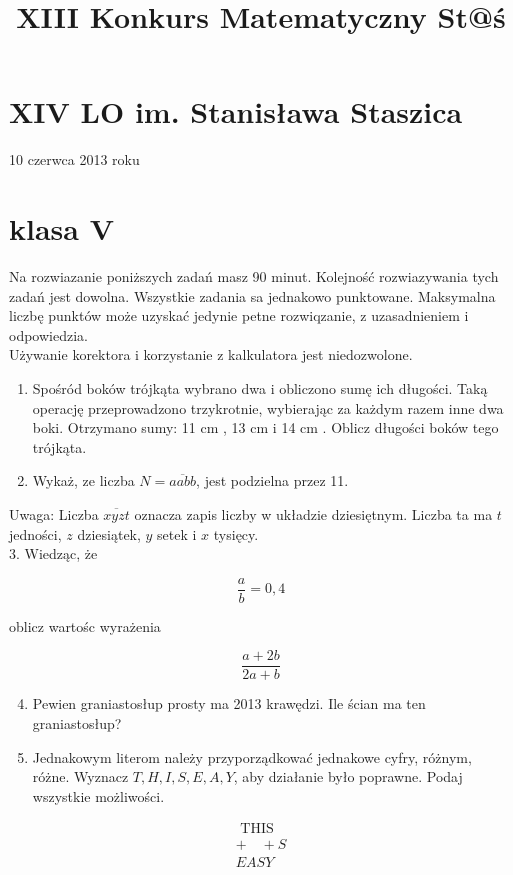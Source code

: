 \documentclass[10pt]{article}
\title{XIII Konkurs Matematyczny St@ś }
\author{}
\date{}
\begin{document}
\maketitle
\section*{XIV LO im. Stanisława Staszica}
10 czerwca 2013 roku

\section*{klasa V}
Na rozwiazanie poniższych zadań masz 90 minut. Kolejność rozwiazywania tych zadań jest dowolna. Wszystkie zadania sa jednakowo punktowane. Maksymalna liczbę punktów może uzyskać jedynie petne rozwiqzanie, z uzasadnieniem i odpowiedzia.\\
Używanie korektora i korzystanie z kalkulatora jest niedozwolone.

\begin{enumerate}
  \item Spośród boków trójkąta wybrano dwa i obliczono sumę ich długości. Taką operację przeprowadzono trzykrotnie, wybierając za każdym razem inne dwa boki. Otrzymano sumy: 11 cm , 13 cm i 14 cm . Oblicz długości boków tego trójkąta.
  \item Wykaż, ze liczba \(N=\overline{a a b b}\), jest podzielna przez 11.
\end{enumerate}

Uwaga: Liczba \(\overline{x y z t}\) oznacza zapis liczby w układzie dziesiętnym. Liczba ta ma \(t\) jedności, \(z\) dziesiątek, \(y\) setek i \(x\) tysięcy.\\
3. Wiedząc, że

\[
\frac{a}{b}=0,4
\]

oblicz wartośc wyrażenia

\[
\frac{a+2 b}{2 a+b}
\]

\begin{enumerate}
  \setcounter{enumi}{3}
  \item Pewien graniastosłup prosty ma 2013 krawędzi. Ile ścian ma ten graniastosłup?
  \item Jednakowym literom należy przyporządkować jednakowe cyfry, różnym, różne. Wyznacz \(T, H, I, S, E, A, Y\), aby działanie było poprawne. Podaj wszystkie możliwości.
\end{enumerate}

\[
\begin{array}{r}
\text { THIS } \\
+\quad+S \\
\hline E A S Y
\end{array}
\]
\end{document}
